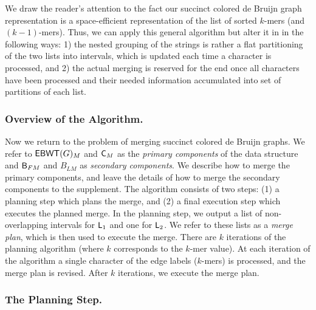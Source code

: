 We draw the reader's attention to the fact our succinct colored de Bruijn graph representation is a space-efficient representation of the list of sorted $k$-mers (and $(k - 1)$-mers).  Thus, we can apply this general algorithm but alter it in in the following ways: 1) the nested grouping of the strings is rather a flat partitioning of the two lists into intervals, which is updated each time a character is processed, and 2) the actual merging is reserved for the end once all characters have been processed and their needed information accumulated into set of partitions of each list.

\subsubsection{Overview of the Algorithm.}

Now we return to the problem of merging succinct colored de Bruijn graphs.  We refer to $\mathsf{EBWT}(G)_M$ and $\mbox{\rm {\sf C}}_M$ as the {\em primary components} of the data structure and $\mathsf{B}_{FM}$ and $B_{LM}$ as {\em secondary components}.  We describe how to merge the primary components, and leave the details of how to merge the secondary components to the supplement.   The algorithm consists of two steps: (1) a planning step which plans the merge, and (2) a final execution step which executes the planned merge. In the planning step, we output a list of non-overlapping intervals for $\mbox{\rm {\sf L}}_{1}$ and one for $\mbox{\rm {\sf L}}_{2}$.  We refer to these lists as a {\em merge plan}, which is then used to execute the merge.  There are $k$ iterations of the planning algorithm (where $k$ corresponds to the $k$-mer value).  At each iteration of the algorithm a single character of the edge labels ($k$-mers) is processed, and the merge plan is revised. After $k$ iterations, we execute the merge plan.


\subsubsection{The Planning Step.}

